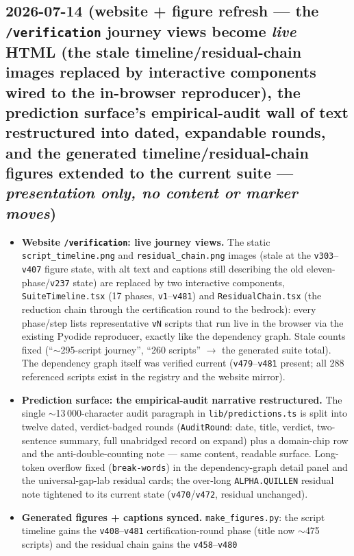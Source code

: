 \subsection*{2026-07-14 (website + figure refresh --- the \texttt{/verification} journey views become \emph{live} HTML (the stale timeline/residual-chain images replaced by interactive components wired to the in-browser reproducer), the prediction surface's empirical-audit wall of text restructured into dated, expandable rounds, and the generated timeline/residual-chain figures extended to the current suite --- \emph{presentation only, no content or marker moves})}
\begin{itemize}[leftmargin=1.5em]
\item \textbf{Website \texttt{/verification}: live journey views.} The static
\texttt{script\_timeline.png} and \texttt{residual\_chain.png} images (stale at the
\texttt{v303}--\texttt{v407} figure state, with alt text and captions still describing the
old eleven-phase/\texttt{v237} state) are replaced by two interactive components,
\texttt{SuiteTimeline.tsx} (17 phases, \texttt{v1}--\texttt{v481}) and
\texttt{ResidualChain.tsx} (the reduction chain through the certification round to the
bedrock): every phase/step lists representative \texttt{vN} scripts that run live in the
browser via the existing Pyodide reproducer, exactly like the dependency graph. Stale counts
fixed (``$\sim$295-script journey'', ``260 scripts'' $\to$ the generated suite total). The
dependency graph itself was verified current (\texttt{v479}--\texttt{v481} present; all 288
referenced scripts exist in the registry and the website mirror).
\item \textbf{Prediction surface: the empirical-audit narrative restructured.} The single
$\sim$13\,000-character audit paragraph in \texttt{lib/predictions.ts} is split into twelve
dated, verdict-badged rounds (\texttt{AuditRound}: date, title, verdict, two-sentence summary,
full unabridged record on expand) plus a domain-chip row and the anti-double-counting note ---
same content, readable surface. Long-token overflow fixed (\texttt{break-words}) in the
dependency-graph detail panel and the universal-gap-lab residual cards; the over-long
\texttt{ALPHA.QUILLEN} residual note tightened to its current state
(\texttt{v470}/\texttt{v472}, residual unchanged).
\item \textbf{Generated figures + captions synced.} \texttt{make\_figures.py}: the script
timeline gains the \texttt{v408}--\texttt{v481} certification-round phase (title now
$\sim$475 scripts) and the residual chain gains the \texttt{v458}--\texttt{v480}

\end{itemize}
